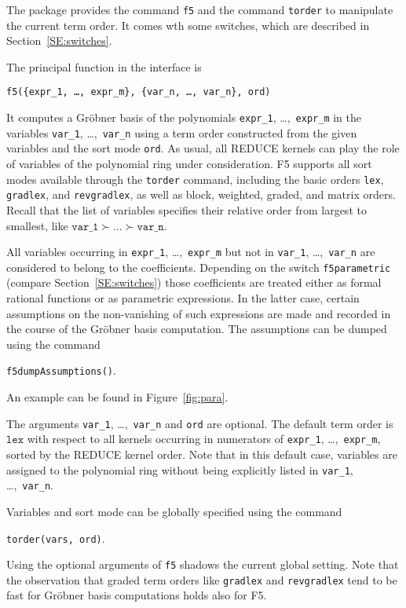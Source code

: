 \documentclass{article}
\newcommand{\grobner}{Gr\"obner}
\newcommand{\code}[1]{\texttt{#1}}
\begin{document}
The package provides the command \code{f5} and the command \code{torder} to manipulate the current
term order. It comes wth some switches, which are described in Section~\ref{SE:switches}.

The principal function in the interface is
%
\begin{center}
    \code{f5(\{expr\_1, \ldots, expr\_m\}, \{var\_n, \ldots, var\_n\}, ord)}
\end{center}
%
It computes a \grobner{} basis of the polynomials \code {expr\_1}, \dots,~\code{expr\_m} in the variables \code{var\_1}, \dots,~\code{var\_n} using a
term order constructed from the given variables and the sort mode \code{ord}. As usual, all REDUCE
kernels can play the role of variables of the polynomial ring under consideration. F5 supports all sort modes
available through the \code{torder} command, including the basic orders \code{lex}, 
\code{gradlex}, and \code{revgradlex}, as well as block, weighted, graded, and matrix orders. 
Recall that the list of variables
specifies their relative order from largest to smallest, like $\code{var\_1} \succ \dots \succ
\code{var\_n}$.

All variables occurring in \code{expr\_1}, \dots,~\code{expr\_m} but not in \code{var\_1},
\dots,~\code{var\_n} are considered to belong to the coefficients. Depending on the switch
\code{f5para\-met\-ric} (compare Section~\ref{SE:switches}) those coefficients are treated either as
formal rational functions or as parametric expressions. In the latter case, certain assumptions on
the non-vanishing of such expressions are made and recorded in the course of the \grobner{} basis
computation. The assumptions can be dumped using the command
%
\begin{center}
\code{f5dumpAssumptions()}.
\end{center}
An example can be found in Figure~\ref{fig:para}.

The arguments \code{var\_1}, \dots,~\code{var\_n} and \code{ord} are optional. The default term
order is $\code{lex}$ with respect to all kernels occurring in numerators of \code{expr\_1},
\dots,~\code{expr\_m}, sorted by the REDUCE kernel order. Note that in this default case, variables
are assigned to the polynomial ring without being explicitly listed in \code{var\_1},
\dots,~\code{var\_n}.

Variables and sort mode can be globally specified using the command
%
\begin{center}
    \code{torder(vars, ord)}.
\end{center}
%
Using the optional arguments of \code{f5} shadows the current global
setting. Note that the observation that graded term orders like
\code{gradlex} and \code{revgradlex} tend to be fast for \grobner{}
basis computations \cite[\S5]{tolstaya} holds also for F5.
\end{document}
